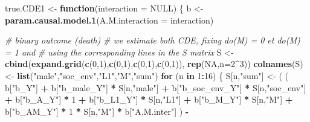 \documentclass[
]{book}
\newenvironment{Shaded}{\begin{snugshade}}{\end{snugshade}}
\newcommand{\AttributeTok}[1]{\textcolor[rgb]{0.13,0.29,0.53}{#1}}
\newcommand{\CommentTok}[1]{\textcolor[rgb]{0.56,0.35,0.01}{\textit{#1}}}
\newcommand{\ConstantTok}[1]{\textcolor[rgb]{0.56,0.35,0.01}{#1}}
\newcommand{\ControlFlowTok}[1]{\textcolor[rgb]{0.13,0.29,0.53}{\textbf{#1}}}
\newcommand{\DecValTok}[1]{\textcolor[rgb]{0.00,0.00,0.81}{#1}}
\newcommand{\FunctionTok}[1]{\textcolor[rgb]{0.13,0.29,0.53}{\textbf{#1}}}
\newcommand{\NormalTok}[1]{#1}
\newcommand{\OtherTok}[1]{\textcolor[rgb]{0.56,0.35,0.01}{#1}}
\newcommand{\SpecialCharTok}[1]{\textcolor[rgb]{0.81,0.36,0.00}{\textbf{#1}}}
\newcommand{\StringTok}[1]{\textcolor[rgb]{0.31,0.60,0.02}{#1}}
\begin{document}
\begin{Shaded}
\begin{Highlighting}[]
\NormalTok{true.CDE1 }\OtherTok{\textless{}{-}} \ControlFlowTok{function}\NormalTok{(}\AttributeTok{interaction =} \ConstantTok{NULL}\NormalTok{) \{}
\NormalTok{  b }\OtherTok{\textless{}{-}} \FunctionTok{param.causal.model.1}\NormalTok{(}\AttributeTok{A.M.interaction =}\NormalTok{ interaction)}
  
  \CommentTok{\# binary outcome (death)}
  \CommentTok{\# we estimate both CDE, fixing do(M) = 0 et do(M) = 1 and }
  \CommentTok{\# using the corresponding lines in the S matrix}
\NormalTok{  S }\OtherTok{\textless{}{-}} \FunctionTok{cbind}\NormalTok{(}\FunctionTok{expand.grid}\NormalTok{(}\FunctionTok{c}\NormalTok{(}\DecValTok{0}\NormalTok{,}\DecValTok{1}\NormalTok{),}\FunctionTok{c}\NormalTok{(}\DecValTok{0}\NormalTok{,}\DecValTok{1}\NormalTok{),}\FunctionTok{c}\NormalTok{(}\DecValTok{0}\NormalTok{,}\DecValTok{1}\NormalTok{),}\FunctionTok{c}\NormalTok{(}\DecValTok{0}\NormalTok{,}\DecValTok{1}\NormalTok{)), }\FunctionTok{rep}\NormalTok{(}\ConstantTok{NA}\NormalTok{,}\AttributeTok{n=}\DecValTok{2}\SpecialCharTok{\^{}}\DecValTok{3}\NormalTok{))}
  \FunctionTok{colnames}\NormalTok{(S) }\OtherTok{\textless{}{-}} \FunctionTok{list}\NormalTok{(}\StringTok{"male"}\NormalTok{,}\StringTok{"soc\_env"}\NormalTok{,}\StringTok{"L1"}\NormalTok{,}\StringTok{"M"}\NormalTok{,}\StringTok{"sum"}\NormalTok{)}
  \ControlFlowTok{for}\NormalTok{ (n }\ControlFlowTok{in} \DecValTok{1}\SpecialCharTok{:}\DecValTok{16}\NormalTok{) \{}
\NormalTok{    S[n,}\StringTok{"sum"}\NormalTok{] }\OtherTok{\textless{}{-}}\NormalTok{ ( ( b[}\StringTok{"b\_Y"}\NormalTok{] }\SpecialCharTok{+} 
\NormalTok{                        b[}\StringTok{"b\_male\_Y"}\NormalTok{] }\SpecialCharTok{*}\NormalTok{ S[n,}\StringTok{"male"}\NormalTok{] }\SpecialCharTok{+} 
\NormalTok{                        b[}\StringTok{"b\_soc\_env\_Y"}\NormalTok{] }\SpecialCharTok{*}\NormalTok{ S[n,}\StringTok{"soc\_env"}\NormalTok{] }\SpecialCharTok{+} 
\NormalTok{                        b[}\StringTok{"b\_A\_Y"}\NormalTok{] }\SpecialCharTok{*} \DecValTok{1} \SpecialCharTok{+} 
\NormalTok{                        b[}\StringTok{"b\_L1\_Y"}\NormalTok{] }\SpecialCharTok{*}\NormalTok{ S[n,}\StringTok{"L1"}\NormalTok{] }\SpecialCharTok{+}
\NormalTok{                        b[}\StringTok{"b\_M\_Y"}\NormalTok{] }\SpecialCharTok{*}\NormalTok{ S[n,}\StringTok{"M"}\NormalTok{] }\SpecialCharTok{+}
\NormalTok{                        b[}\StringTok{"b\_AM\_Y"}\NormalTok{] }\SpecialCharTok{*} \DecValTok{1} \SpecialCharTok{*}\NormalTok{ S[n,}\StringTok{"M"}\NormalTok{] }\SpecialCharTok{*}\NormalTok{ b[}\StringTok{"A.M.inter"}\NormalTok{] ) }\SpecialCharTok{{-}} 

\end{Highlighting}
\end{Shaded}
\end{document}
